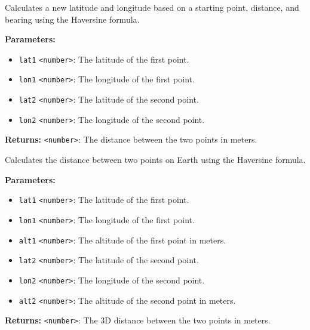 \documentclass[12pt,a4paper]{article}
\begin{document}
\noindent Calculates a new latitude and longitude based on a starting point, distance, and bearing using the Haversine formula.

\vspace{5mm}
\noindent {}


\noindent \textbf{Parameters:}
\begin{itemize}
  \item \texttt{lat1} \texttt{<number>}: The latitude of the first point.
  \item \texttt{lon1} \texttt{<number>}: The longitude of the first point.
  \item \texttt{lat2} \texttt{<number>}: The latitude of the second point.
  \item \texttt{lon2} \texttt{<number>}: The longitude of the second point.
\end{itemize}

\noindent \textbf{Returns:} \texttt{<number>}: The distance between the two points in meters.

\noindent Calculates the distance between two points on Earth using the Haversine formula.

\vspace{5mm}
\noindent {}


\noindent \textbf{Parameters:}
\begin{itemize}
  \item \texttt{lat1} \texttt{<number>}: The latitude of the first point.
  \item \texttt{lon1} \texttt{<number>}: The longitude of the first point.
  \item \texttt{alt1} \texttt{<number>}: The altitude of the first point in meters.
  \item \texttt{lat2} \texttt{<number>}: The latitude of the second point.
  \item \texttt{lon2} \texttt{<number>}: The longitude of the second point.
  \item \texttt{alt2} \texttt{<number>}: The altitude of the second point in meters.
\end{itemize}

\noindent \textbf{Returns:} \texttt{<number>}: The 3D distance between the two points in meters.
\end{document}
